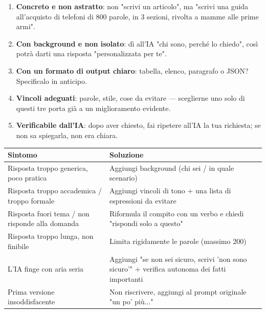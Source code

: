 \begin{enumerate}
  \item \textbf{Concreto e non astratto}: non "scrivi un articolo", ma "scrivi una guida all'acquisto di telefoni di 800 parole, in 3 sezioni, rivolta a mamme alle prime armi".
  \item \textbf{Con background e non isolato}: dì all'IA "chi sono, perché lo chiedo", così potrà darti una risposta "personalizzata per te".
  \item \textbf{Con un formato di output chiaro}: tabella, elenco, paragrafo o JSON? Specificalo in anticipo.
  \item \textbf{Vincoli adeguati}: parole, stile, cose da evitare — sceglierne uno solo di questi tre porta già a un miglioramento evidente.
  \item \textbf{Verificabile dall'IA}: dopo aver chiesto, fai ripetere all'IA la tua richiesta; se non sa spiegarla, non era chiara.
\end{enumerate}


\begin{center}
\begin{tabularx}{\linewidth}{|X|X|}
\hline
\textbf{Sintomo} & \textbf{Soluzione} \tabularnewline
\hline
Risposta troppo generica, poco pratica & Aggiungi background (chi sei / in quale scenario) \tabularnewline
Risposta troppo accademica / troppo formale & Aggiungi vincoli di tono + una lista di espressioni da evitare \tabularnewline
Risposta fuori tema / non risponde alla domanda & Riformula il compito con un verbo e chiedi "rispondi solo a questo" \tabularnewline
Risposta troppo lunga, non finibile & Limita rigidamente le parole (massimo 200) \tabularnewline
L'IA finge con aria seria & Aggiungi "se non sei sicuro, scrivi 'non sono sicuro'" + verifica autonoma dei fatti importanti \tabularnewline
Prima versione insoddisfacente & Non riscrivere, aggiungi al prompt originale "un po' più..." \tabularnewline
\hline
\end{tabularx}
\end{center}


